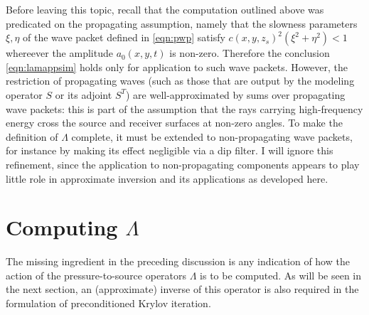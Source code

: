 \documentclass[12pt]{geophysics}
\begin{document}
Before leaving this topic, recall that the computation outlined above
was predicated on the propagating assumption, namely that the slowness
parameters $\xi,\eta$ of the wave packet defined in \ref{eqn:pwp}
satisfy $c(x,y,z_s)^2(\xi^2 + \eta^2) < 1$ whereever the amplitude
$a_0(x,y,t)$ is non-zero. Therefore the conclusion \ref{eqn:lamappsim}
holds only for application to such wave packets. However, the restriction of
propagating waves (such as those that are output by the modeling
operator $S$ or its adjoint $S^T$) are well-approximated by sums over
propagating wave packets: this is part of the assumption that the rays
carrying high-frequency energy cross the source and receiver surfaces
at non-zero angles. To make the definition of $\Lambda$ complete, it
must be extended to non-propagating wave packets, for instance by
making its effect negligible via a dip filter. I will ignore this refinement, since the
application to non-propagating components appears to play little role
in approximate inversion and its applications as developed here.

\section{Computing $\Lambda$}

The missing ingredient in the preceding discussion is any indication
of how the action of the pressure-to-source operators $\Lambda$ is to be
computed. As will be seen in the next section, an (approximate)
inverse of this operator is also required in the formulation of
preconditioned Krylov iteration. 
\end{document}
